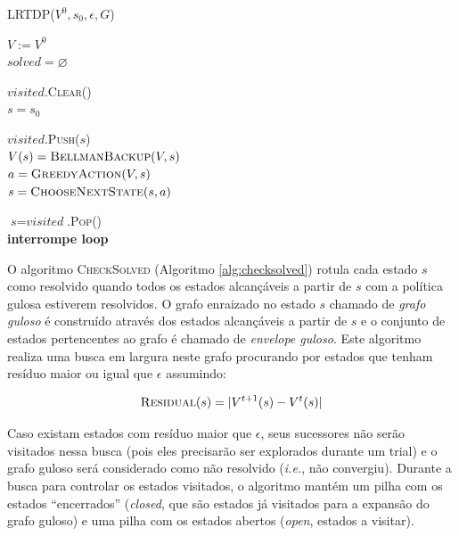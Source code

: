 \documentclass[letterpaper]{article}
\begin{document}
\linesnumbered
\begin{algorithm}[t]
{
	\caption{\textsc{LRTDP}($ V^0, s_0, \epsilon, G $)}
	\label{alg:lrtdp-enum}
    $V := V^0$\\
    $ \textit{solved} = \varnothing $\\

    {
        $\textit{visited}$.\textsc{Clear}() \\
        $\textit{s} = s_0 $

        {
            $\mathit{visited}$.\textsc{Push}($\textit{s}$)\\

            $V(s) = \textsc{BellmanBackup}(V, s)$ \\
           	$a = \textsc{GreedyAction}(V, s)$ \\
           	$s = \textsc{ChooseNextState}(s, a)$ \\
        }

        {
            $\textit{s} = \textit{visited}$.\textsc{Pop}()\\
             {\textbf{interrompe loop}}
        }
    }

}
\end{algorithm}


O algoritmo \textsc{CheckSolved} (Algoritmo \ref{alg:checksolved}) rotula cada estado $s$ como resolvido quando todos os estados alcançáveis a partir de $s$ com a política gulosa estiverem resolvidos. O grafo enraizado no estado $s$ chamado de \emph{grafo guloso} é construído através dos estados alcançáveis a partir de $s$ e o conjunto de estados pertencentes ao grafo é chamado de {\em envelope guloso}.
Este algoritmo realiza uma busca em largura neste grafo procurando por estados que tenham resíduo maior ou igual que $\epsilon$ assumindo:

\begin{equation} \label{eq:state_residual}
     \textsc{Residual}(s) = | V^{t+1}(s) - V^t(s)|
\end{equation}

Caso existam estados com resíduo maior que $\epsilon$, seus sucessores não serão visitados nessa busca (pois eles precisarão ser explorados durante um trial) e o grafo guloso será considerado como não resolvido (\textit{i.e.}, não convergiu).
Durante a busca para controlar os estados visitados, o algoritmo mantém um pilha com os estados ``encerrados'' (\textit{closed}, que são estados já visitados para a expansão do grafo guloso) e uma pilha com os estados abertos (\textit{open}, estados a visitar).
\end{document}
